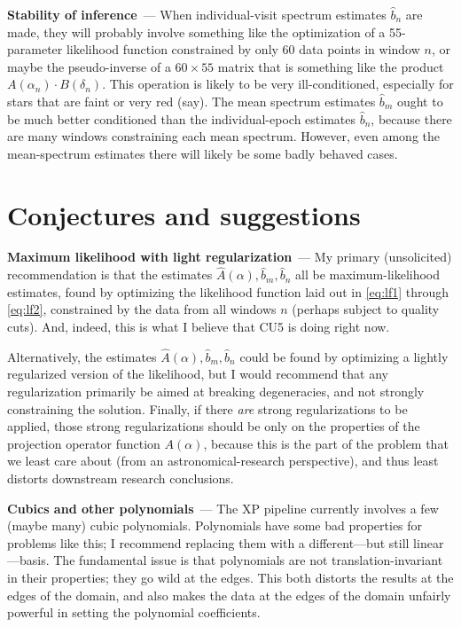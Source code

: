 \documentclass[11pt]{article}
\renewcommand{\paragraph}[1]{\medskip\par\noindent\textbf{#1}~---}
\begin{document}
\paragraph{Stability of inference}
When individual-visit spectrum estimates $\hat{b}_n$ are made, they will probably involve something like the optimization of a 55-parameter likelihood function constrained by only 60 data points in window $n$, or maybe the pseudo-inverse of a $60\times 55$ matrix that is something like the product $A(\alpha_n)\cdot B(\delta_n)$.
This operation is likely to be very ill-conditioned, especially for stars that are faint or very red (say).
The mean spectrum estimates $\hat{b}_m$ ought to be much better conditioned than the individual-epoch estimates $\hat{b}_n$, because there are many windows constraining each mean spectrum.
However, even among the mean-spectrum estimates there will likely be some badly behaved cases.

\section{Conjectures and suggestions}

\paragraph{Maximum likelihood with light regularization}
My primary (unsolicited) recommendation is that the estimates $\hat{A}(\alpha), \hat{b}_m, \hat{b}_n$ all be maximum-likelihood estimates, found by optimizing the likelihood function laid out in \eqref{eq:lf1} through \eqref{eq:lf2}, constrained by the data from all windows $n$ (perhaps subject to quality cuts).
And, indeed, this is what I believe that CU5 is doing right now.

Alternatively, the estimates $\hat{A}(\alpha), \hat{b}_m, \hat{b}_n$ could be found by optimizing a lightly regularized version of the likelihood, but I would recommend that any regularization primarily be aimed at breaking degeneracies, and not strongly constraining the solution.
Finally, if there \emph{are} strong regularizations to be applied, those strong regularizations should be only on the properties of the projection operator function $A(\alpha)$, because this is the part of the problem that we least care about (from an astronomical-research perspective), and thus least distorts downstream research conclusions.

\paragraph{Cubics and other polynomials}
The XP pipeline currently involves a few (maybe many) cubic polynomials.
Polynomials have some bad properties for problems like this; I recommend replacing them with a different---but still linear---basis.
The fundamental issue is that polynomials are not translation-invariant in their properties; they go wild at the edges.
This both distorts the results at the edges of the domain, and also makes the data at the edges of the domain unfairly powerful in setting the polynomial coefficients.
\end{document}
